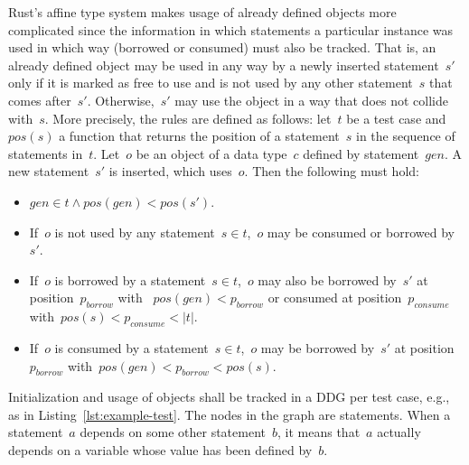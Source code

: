 \documentclass{article}
\begin{document}
Rust's affine type system makes usage of already defined objects more complicated since the information in which statements a particular instance was used in which way (borrowed or consumed) must also be tracked. That is, an already defined object may be used in any way by a newly inserted statement~$s'$ only if it is marked as free to use and is not used by any other statement~$s$ that comes after~$s'$. Otherwise,~$s'$ may use the object in a way that does not collide with~$s$. More precisely, the rules are defined as follows: let~$t$ be a test case and $pos(s)$ a function that returns the position of a statement~$s$ in the sequence of statements in~$t$. Let~$o$ be an object of a data type~$c$ defined by statement~$gen$. A new statement~$s'$ is inserted, which uses~$o$. Then the following must hold:
\begin{itemize}
    \item $gen \in t \wedge pos(gen) < pos(s')$.
    \item If~$o$ is not used by any statement~$s \in t$,~$o$ may be consumed or borrowed by~$s'$. 
    \item If~$o$ is borrowed by a statement~$s \in t$,~$o$ may also be borrowed by~$s'$ at position~$p_{borrow}$ with ~$pos(gen) < p_{borrow}$ or consumed at position~$p_{consume}$ with~$pos(s) < p_{consume} < \left|t\right|$. 
    \item If~$o$ is consumed by a statement~$s \in t$,~$o$ may be borrowed by~$s'$ at position~$p_{borrow}$ with~$pos(gen) < p_{borrow} < pos(s)$. 
\end{itemize}

Initialization and usage of objects shall be tracked in a \ac{DDG} per test case, e.g., as in Listing~\ref{lst:example-test}. The nodes in the graph are statements. When a statement~$a$ depends on some other statement~$b$, it means that~$a$ actually depends on a variable whose value has been defined by~$b$. 
\end{document}
